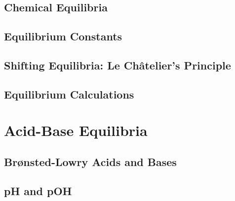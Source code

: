 \documentclass[12pt, openany, letterpaper]{memoir}
\begin{document}
\section{Chemical Equilibria}

\section{Equilibrium Constants}

\section{Shifting Equilibria: Le Ch\^atelier's Principle}

\section{Equilibrium Calculations}

\chapter{Acid-Base Equilibria}

\section{Brønsted-Lowry Acids and Bases}

\section{pH and pOH}
\end{document}
